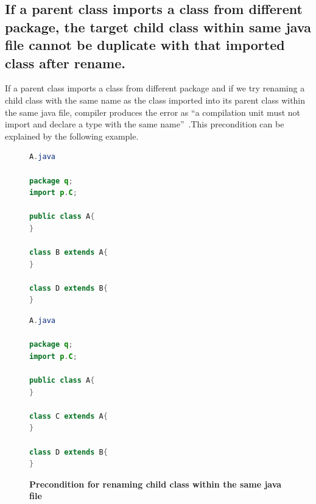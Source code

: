 \subsection{If a parent class imports a class from different package, the target child class within same java file cannot be duplicate with that imported class after rename.}

If a parent class imports a class from different package and if we try renaming a child class with the same name as the class imported into its parent class within the same java file, compiler produces the error as ``a compilation unit must not import and declare a type with the same name''~\cite{EclipseWebPage}.This precondition can be explained by the following example.

\begin{figure}[th]
\centering
\begin{minipage}[t]{0.45\linewidth}
\begin{lstlisting}[language=java, basicstyle=\scriptsize\ttfamily,frame=single]	
A.java

package q;
import p.C;

public class A{	
}

class B extends A{	
}

class D extends B{
}
\end{lstlisting}
\end{minipage}
\hfill
\begin{minipage}[t]{0.45\linewidth}
\begin{lstlisting}[language=java, basicstyle=\scriptsize\ttfamily,frame=single]
A.java

package q;
import p.C;

public class A{	
}

class C extends A{	
}

class D extends B{
}	
\end{lstlisting}
\end{minipage}
\caption{\textbf{Precondition for renaming child class within the same java file}}
\label{figure:figpc3_1}
\end{figure}

